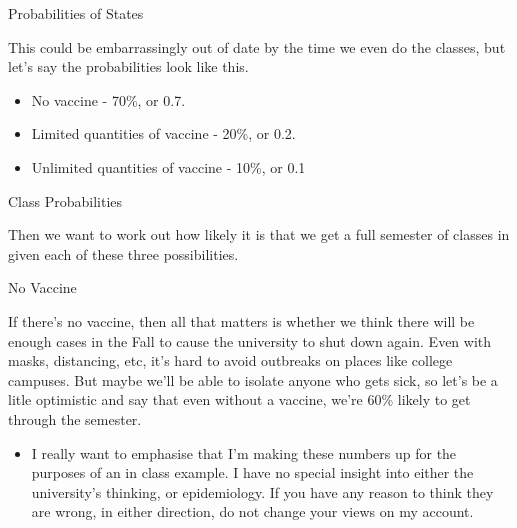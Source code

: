 \documentclass[
  ignorenonframetext,
]{beamer}
\providecommand{\tightlist}{%
  \setlength{\itemsep}{0pt}\setlength{\parskip}{0pt}}
\renewcommand{\,}{\text{, }}
\begin{document}
\begin{frame}{Probabilities of States}
\protect\hypertarget{probabilities-of-states}{}

This could be embarrassingly out of date by the time we even do the
classes, but let's say the probabilities look like this.

\begin{itemize}
\tightlist
\item
  No vaccine - 70\%, or 0.7.
\item
  Limited quantities of vaccine - 20\%, or 0.2.
\item
  Unlimited quantities of vaccine - 10\%, or 0.1
\end{itemize}

\end{frame}

\begin{frame}{Class Probabilities}
\protect\hypertarget{class-probabilities}{}

Then we want to work out how likely it is that we get a full semester of
classes in given each of these three possibilities.

\end{frame}

\begin{frame}{No Vaccine}
\protect\hypertarget{no-vaccine}{}

If there's no vaccine, then all that matters is whether we think there
will be enough cases in the Fall to cause the university to shut down
again. Even with masks, distancing, etc, it's hard to avoid outbreaks on
places like college campuses. But maybe we'll be able to isolate anyone
who gets sick, so let's be a litle optimistic and say that even without
a vaccine, we're 60\% likely to get through the semester.

\begin{itemize}[<+->]
\tightlist
\item
  I really want to emphasise that I'm making these numbers up for the
  purposes of an in class example. I have no special insight into either
  the university's thinking, or epidemiology. If you have any reason to
  think they are wrong, in either direction, do not change your views on
  my account.
\end{itemize}

\end{frame}
\end{document}
